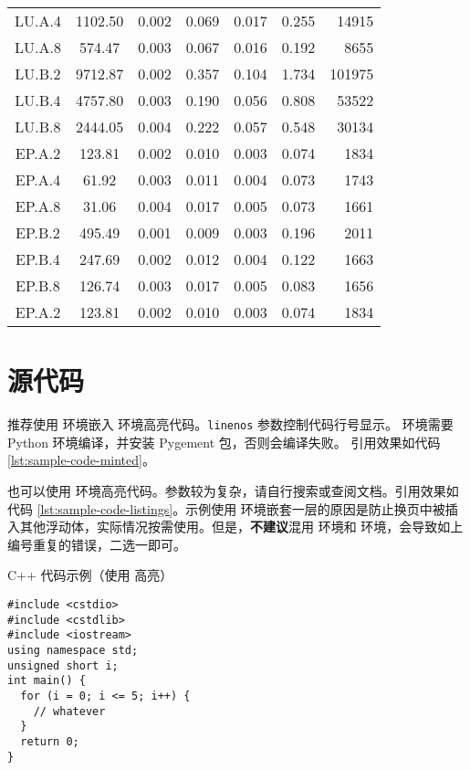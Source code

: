 \begin{longtable}[c]{ccccclr}
  LU.A.4 & 1102.50 & 0.002 & 0.069 & 0.017 & 0.255 & 14915 \\
  LU.A.8 & 574.47 & 0.003 & 0.067 & 0.016 & 0.192 & 8655 \\
  LU.B.2 & 9712.87 & 0.002 & 0.357 & 0.104 & 1.734 & 101975 \\
  LU.B.4 & 4757.80 & 0.003 & 0.190 & 0.056 & 0.808 & 53522 \\
  LU.B.8 & 2444.05 & 0.004 & 0.222 & 0.057 & 0.548 & 30134 \\
  EP.A.2 & 123.81 & 0.002 & 0.010 & 0.003 & 0.074 & 1834 \\
  EP.A.4 & 61.92 & 0.003 & 0.011 & 0.004 & 0.073 & 1743 \\
  EP.A.8 & 31.06 & 0.004 & 0.017 & 0.005 & 0.073 & 1661 \\
  EP.B.2 & 495.49 & 0.001 & 0.009 & 0.003 & 0.196 & 2011 \\
  EP.B.4 & 247.69 & 0.002 & 0.012 & 0.004 & 0.122 & 1663 \\
  EP.B.8 & 126.74 & 0.003 & 0.017 & 0.005 & 0.083 & 1656 \\
  EP.A.2 & 123.81 & 0.002 & 0.010 & 0.003 & 0.074 & 1834 \\
  \bottomrule[1.5pt]
\end{longtable}


\section{源代码}

推荐使用  环境嵌入  环境高亮代码。\verb|linenos| 参数控制代码行号显示。 环境需要 Python 环境编译，并安装 Pygement 包，否则会编译失败。
引用效果如代码 \ref{lst:sample-code-minted}。

也可以使用  环境高亮代码。参数较为复杂，请自行搜索或查阅文档。引用效果如代码 \ref{lst:sample-code-listings}。示例使用  环境嵌套一层的原因是防止换页中被插入其他浮动体，实际情况按需使用。但是，\textbf{不建议}混用  环境和  环境，会导致如上编号重复的错误，二选一即可。

\begin{listing}[!ht]
\caption{C++ 代码示例（使用  高亮）}
\label{lst:sample-code-minted}
\begin{verbatim}
#include <cstdio>
#include <cstdlib>
#include <iostream>
using namespace std;
unsigned short i;
int main() {
  for (i = 0; i <= 5; i++) {
    // whatever
  }
  return 0;
}
\end{verbatim}
\end{listing}

